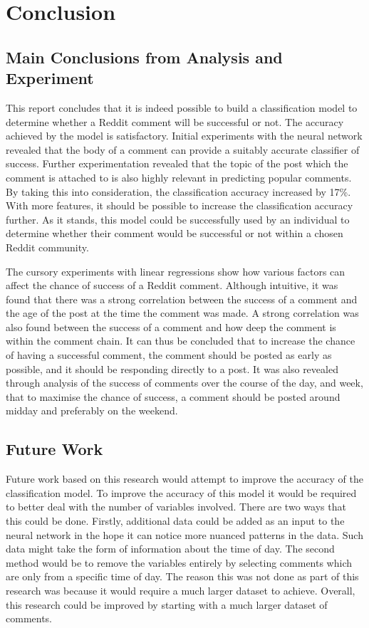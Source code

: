 \chapter{Conclusion}\label{ch:Conclusion}

\section{Main Conclusions from Analysis and Experiment}

This report concludes that it is indeed possible to build a classification model to determine whether a Reddit comment will be successful or not. The accuracy achieved by the model is satisfactory. Initial experiments with the neural network revealed that the body of a comment can provide a suitably accurate classifier of success. Further experimentation revealed that the topic of the post which the comment is attached to is also highly relevant in predicting popular comments. By taking this into consideration, the classification accuracy increased by 17\%. With more features, it should be possible to increase the classification accuracy further. As it stands, this model could be successfully used by an individual to determine whether their comment would be successful or not within a chosen Reddit community.

The cursory experiments with linear regressions show how various factors can affect the chance of success of a Reddit comment. Although intuitive, it was found that there was a strong correlation between the success of a comment and the age of the post at the time the comment was made. A strong correlation was also found between the success of a comment and how deep the comment is within the comment chain. It can thus be concluded that to increase the chance of having a successful comment, the comment should be posted as early as possible, and it should be responding directly to a post. It was also revealed through analysis of the success of comments over the course of the day, and week, that to maximise the chance of success, a comment should be posted around midday and preferably on the weekend.


\section{Future Work}

Future work based on this research would attempt to improve the accuracy of the classification model. To improve the accuracy of this model it would be required to better deal with the number of variables involved. There are two ways that this could be done. Firstly, additional data could be added as an input to the neural network in the hope it can notice more nuanced patterns in the data. Such data might take the form of information about the time of day. The second method would be to remove the variables entirely by selecting comments which are only from a specific time of day. The reason this was not done as part of this research was because it would require a much larger dataset to achieve. Overall, this research could be improved by starting with a much larger dataset of comments.

